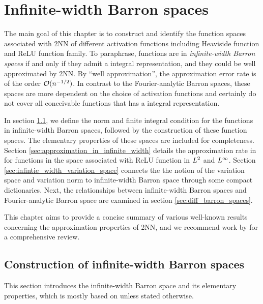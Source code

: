 \chapter{Infinite-width Barron spaces}
\label{ch:infinite}

The main goal of this chapter is to construct and identify the function spaces
associated with 2NN of different activation functions including Heaviside
function and ReLU function family. To paraphrase, functions are in
\textit{infinite-width Barron spaces} if and only if they admit a integral
representation, and they could be well approximated by 2NN. By ``well
approximation'', the approximation error rate is of the order $\mathcal{O}(n^{-1/2})$.
In contrast to the Fourier-analytic Barron spaces, these spaces are more
dependent on the choice of activation functions and certainly do not cover all
conceivable functions that has a integral representation. 

In section \ref{sec:construction_of_infinite_width}, we define the norm and
finite integral condition for the functions in infinite-width Barron spaces,
followed by the construction of these function spaces. The elementary properties
of these spaces are included for completeness. Section
\ref{sec:approximation_in_infinite_width} details the approximation rate in for
functions in the space associated with ReLU function in $L^{2}$ and
$L^{\infty}$. Section \ref{sec:infintie_width_variation_space} connects the the
notion of the variation space and variation norm to infinite-width Barron space
through some compact dictionaries. Next, the relationships between
infinite-width Barron spaces and Fourier-analytic Barron space are examined in
section \ref{sec:diff_barron_spaces}.

This chapter aims to provide a concise summary of various well-known results
concerning the approximation properties of 2NN, and we recommend work by
\cite{eMathematicalUnderstandingNeural2020,bernerModernMathematicsDeep2021} for
a comprehensive review.


\section{Construction of infinite-width Barron spaces}
\label{sec:construction_of_infinite_width}

This section introduces the infinite-width Barron space and its elementary
properties, which is mostly based on \cite{eBarronSpaceFlowinduced2021} unless
stated otherwise.

